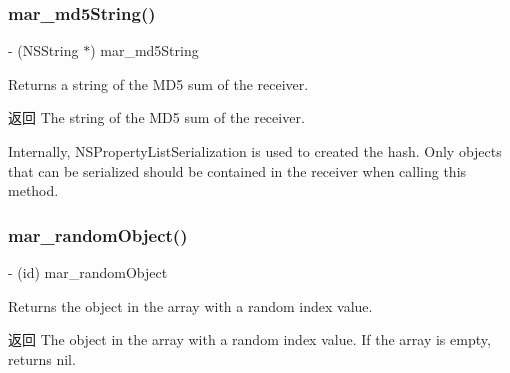 \mbox{\label{category_n_s_array_07_m_a_r_e_x_08_abae762adf6698d51e984c8e2e2229a9f}} 
\subsubsection{\texorpdfstring{mar\+\_\+md5\+String()}{mar\_md5String()}}
{\footnotesize\ttfamily -\/ (N\+S\+String $\ast$) mar\+\_\+md5\+String \begin{DoxyParamCaption}{ }\end{DoxyParamCaption}}

Returns a string of the M\+D5 sum of the receiver.

\begin{DoxyReturn}{返回}
The string of the M\+D5 sum of the receiver.
\end{DoxyReturn}
Internally, {\ttfamily N\+S\+Property\+List\+Serialization} is used to created the hash. Only objects that can be serialized should be contained in the receiver when calling this method. \mbox{\label{category_n_s_array_07_m_a_r_e_x_08_ac8f044b194d349e3bed622f90287eeb0}} 
\subsubsection{\texorpdfstring{mar\+\_\+random\+Object()}{mar\_randomObject()}}
{\footnotesize\ttfamily -\/ (id) mar\+\_\+random\+Object \begin{DoxyParamCaption}{ }\end{DoxyParamCaption}}

Returns the object in the array with a random index value.

\begin{DoxyReturn}{返回}
The object in the array with a random index value. If the array is empty, returns {\ttfamily nil}. 
\end{DoxyReturn}
\mbox{\label{category_n_s_array_07_m_a_r_e_x_08_ac06e904985c9cb115219a1e91e1e2ca1}} 

